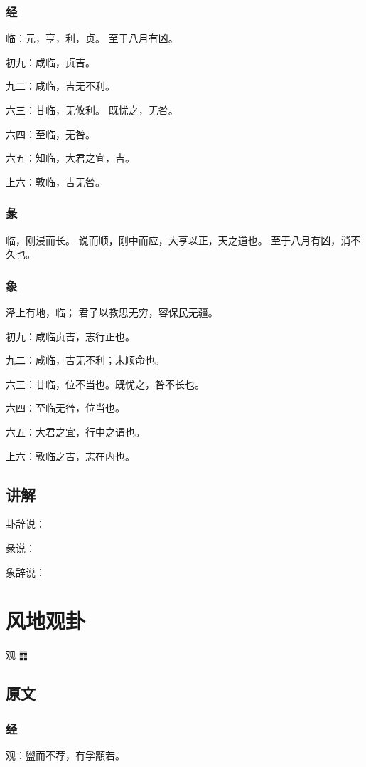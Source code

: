 \documentclass[12pt,oneside]{book}
\begin{document}
\subsection{经}
临：元，亨，利，贞。 至于八月有凶。

初九：咸临，贞吉。

九二：咸临，吉无不利。

六三：甘临，无攸利。 既忧之，无咎。

六四：至临，无咎。

六五：知临，大君之宜，吉。

上六：敦临，吉无咎。

\subsection{彖}
临，刚浸而长。 说而顺，刚中而应，大亨以正，天之道也。 至于八月有凶，消不久也。

\subsection{象}
泽上有地，临； 君子以教思无穷，容保民无疆。

初九：咸临贞吉，志行正也。

九二：咸临，吉无不利；未顺命也。

六三：甘临，位不当也。既忧之，咎不长也。

六四：至临无咎，位当也。

六五：大君之宜，行中之谓也。

上六：敦临之吉，志在内也。

\section{讲解}
卦辞说：

彖说：

象辞说：


\chapter{风地观卦}
观 {\Large ䷓}

\section{原文}

\subsection{经}
观：盥而不荐，有孚顒若。
\end{document}
